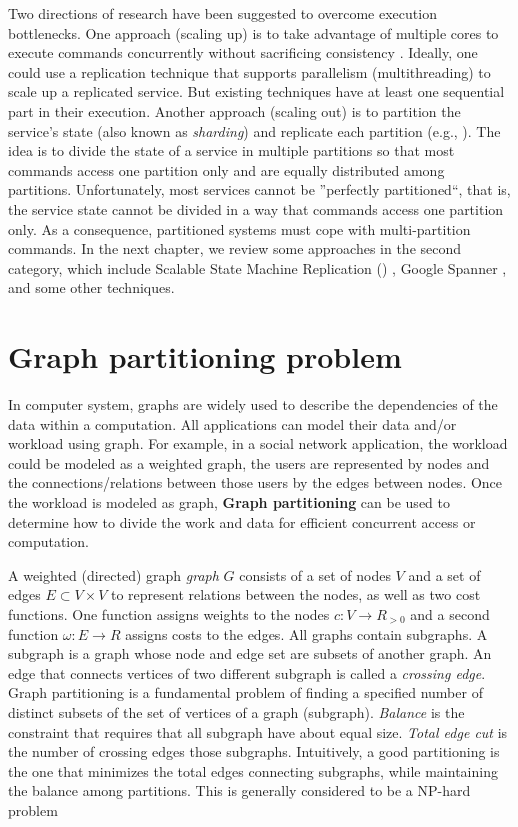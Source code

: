 Two directions of research have been suggested to overcome execution
bottlenecks. One approach (scaling up) is to take advantage of multiple cores to
execute commands concurrently without sacrificing consistency
\cite{Kapritsos:2012um,Marandi:2014bj,Kotla:2004ep,guo2014rex}. Ideally, one
could use a replication technique that supports parallelism (multithreading) to
scale up a replicated service. But existing techniques have at least one
sequential part in their execution. Another approach (scaling out) is to
partition the service's state (also known as \emph{sharding}) and replicate each
partition (e.g., \cite{Glendenning:2011kj,Marandi:2011dj}). The idea is to
divide the state of a service in multiple partitions so that most commands
access one partition only and are equally distributed among partitions.
Unfortunately, most services cannot be ''perfectly partitioned``, that is, the
service state cannot be divided in a way that commands access one partition
only. As a consequence, partitioned systems must cope with multi-partition
commands. In the next chapter, we review some approaches in the second category,
which include Scalable State Machine Replication (\ssmr) \cite{bezerra2014ssmr},
Google Spanner \cite{corbett2013spanner}, and some other techniques.


\section{Graph partitioning problem}

In computer system, graphs are widely used to describe the dependencies of the
data within a computation. All applications can model their data and/or workload
using graph. For example, in a social network application, the workload could be
modeled as a weighted graph, the users are represented by nodes and the
connections/relations between those users by the edges between nodes. Once the
workload is modeled as graph, \textbf{Graph partitioning} can be used to
determine how to divide the work and data for efficient concurrent access or
computation.

A weighted (directed) graph \emph{graph} $G$ consists of a set of nodes $V$ and
a set of edges $E \subset V \times V$ to represent relations between the nodes,
as well as two cost functions. One function assigns weights to the nodes $c : V
\rightarrow R_{>0}$ and a second function $\omega : E \rightarrow R$ assigns
costs to the edges. All graphs contain subgraphs. A subgraph is a graph whose
node and edge set are subsets of another graph. An edge that connects vertices
of two different subgraph is called a \emph{crossing edge}. Graph partitioning
is a fundamental problem of finding a specified number of distinct subsets of
the set of vertices of a graph (subgraph). \emph{Balance} is the constraint that
requires that all subgraph have about equal size. \emph{Total edge cut} is the
number of crossing edges those subgraphs. Intuitively, a good partitioning is
the one that minimizes the total edges connecting subgraphs, while maintaining
the balance among partitions. This is generally considered to be a NP-hard
problem \cite{10.1006/jpdc.1997.1404}

